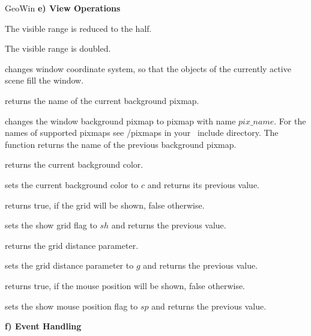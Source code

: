 \begin{ccRefClass}{GeoWin}
\medskip
{\bf e) View Operations}

{The visible range is reduced to the half. }

{The visible range is doubled. }

{changes window coordinate system, so that the objects of the 
currently active scene fill the window. }

\begin{ccAdvanced}
{returns the name of the current background pixmap.}
  	    
{changes the window background pixmap to pixmap with name $pix\_name$.
For the names of supported pixmaps see /pixmaps in your \leda\ include
directory.
The function returns the name of the previous background pixmap.}
\end{ccAdvanced}


{returns the current background color.}
  	    
{sets the current background color to $c$ and returns its previous value.}	 

{returns true, if the grid will be shown, false otherwise.}
  
{sets the show grid flag to $sh$ and returns the previous value.}
  
{returns the grid distance parameter.}
  
{sets the grid distance parameter to $g$ and returns the previous value.}
  
{returns true, if the mouse position will be shown, false otherwise.}
  
{sets the show mouse position flag to $sp$ and returns the previous value.} 

\begin{ccAdvanced}
\medskip
{\bf f) Event Handling} 


\end{ccAdvanced}
\end{ccRefClass}
